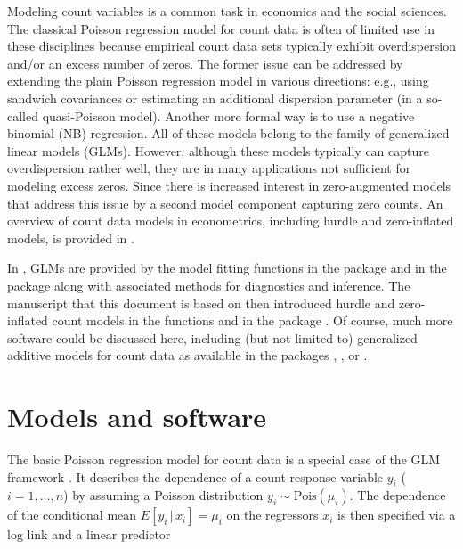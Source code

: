 \documentclass[
  article]{jss}
\newcommand{\fct}[1]{\code{#1()}}
\begin{document}
Modeling count variables is a common task in economics and the social
sciences. The classical Poisson regression model for count data is often
of limited use in these disciplines because empirical count data sets
typically exhibit overdispersion and/or an excess number of zeros. The
former issue can be addressed by extending the plain Poisson regression
model in various directions: e.g., using sandwich covariances or
estimating an additional dispersion parameter (in a so-called
quasi-Poisson model). Another more formal way is to use a negative
binomial (NB) regression. All of these models belong to the family of
generalized linear models (GLMs). However, although these models
typically can capture overdispersion rather well, they are in many
applications not sufficient for modeling excess zeros. Since
\citet{Mullahy1986} there is increased interest in zero-augmented models
that address this issue by a second model component capturing zero
counts. An overview of count data models in econometrics, including
hurdle and zero-inflated models, is provided in
\citet{CameronTrivedi2013}.

In  \citet{R}, GLMs are provided by the model fitting
functions \fct{glm} in the  package and \fct{glm.nb} in the
 package \citep{VenablesRipley2002} along with associated
methods for diagnostics and inference. The manuscript that this document
is based on \citep{ZeileisKleiberJackman2008} then introduced hurdle and
zero-inflated count models in the functions \fct{hurdle} and
\fct{zeroinfl} in the  package \citet{Jackman2015}. Of course,
much more software could be discussed here, including (but not limited
to) generalized additive models for count data as available in the
 packages  \citet{Wood2006}, 
\citet{StasinopoulosRigby2007}, or  \citet{Yee2009}.

\hypertarget{sec-models}{%
\section{Models and software}\label{sec-models}}

The basic Poisson regression model for count data is a special case of
the GLM framework \citet{McCullaghNelder1989}. It describes the
dependence of a count response variable \(y_i\) (\(i = 1, \dots, n\)) by
assuming a Poisson distribution \(y_i \sim \mathrm{Pois}(\mu_i)\). The
dependence of the conditional mean \(E[y_i \, | \, x_i] = \mu_i\) on the
regressors \(x_i\) is then specified via a log link and a linear
predictor
\end{document}
